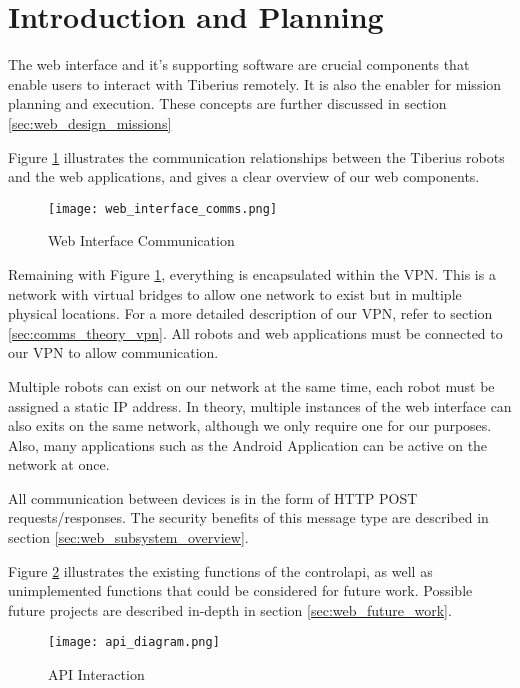 \section{Introduction and Planning}

The web interface and it's supporting software are crucial components that enable users to interact with Tiberius remotely. It is also the enabler for mission planning and execution. These concepts are further discussed in section \ref{sec:web_design_missions}

Figure \ref{fig:web-interface-communication} illustrates the communication relationships between the Tiberius robots and the web applications, and gives a clear overview of our web components.

\begin{figure}[!htb]
\begin{center}
\texttt{[image: web\_interface\_comms.png]}
\end{center}
\caption{Web Interface Communication}
\label{fig:web-interface-communication}
\end{figure}

Remaining with Figure \ref{fig:web-interface-communication}, everything is encapsulated within the \gls{VPN}. This is a network with virtual bridges to allow one network to exist but in multiple physical locations. For a more detailed description of our \gls{VPN}, refer to section \ref{sec:comms_theory_vpn}. All robots and web applications must be connected to our \gls{VPN} to allow communication.

Multiple robots can exist on our network at the same time, each robot must be assigned a static IP address. In theory, multiple instances of the web interface can also exits on the same network, although we only require one for our purposes. Also, many applications such as the Android Application can be active on the network at once.

All communication between devices is in the form of \gls{HTTP} \gls{POST} requests/responses. The security benefits of this message type are described in section \ref{sec:web_subsystem_overview}.

Figure \ref{fig:api-interaction} illustrates the existing functions of the \gls{controlapi}, as well as unimplemented functions that could be considered for future work. Possible future projects are described in-depth in section \ref{sec:web_future_work}.

\begin{figure}[!htb]
\begin{center}
\texttt{[image: api\_diagram.png]}
\end{center}
\caption{API Interaction}
\label{fig:api-interaction}
\end{figure}

